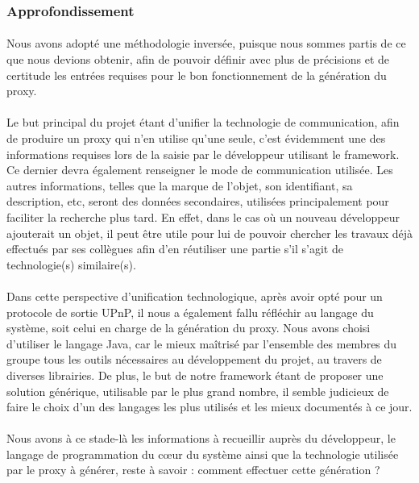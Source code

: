\documentclass[nocopyrightspace]{sigplanconf}
\begin{document}
		\subsubsection{Approfondissement}
			\paragraph{}
			Nous avons adopté une méthodologie inversée, puisque nous sommes partis de ce que nous devions obtenir, afin de pouvoir définir avec plus de précisions et de certitude les entrées requises pour le bon fonctionnement de la génération du proxy.

			\paragraph{}
			Le but principal du projet étant d’unifier la technologie de communication, afin de produire un proxy qui n’en utilise qu’une seule, c’est évidemment une des informations requises lors de la saisie par le développeur utilisant le framework. Ce dernier devra également renseigner le mode de communication utilisée. Les autres informations, telles que la marque de l’objet, son identifiant, sa description, etc, seront des données secondaires, utilisées principalement pour faciliter la recherche plus tard. En effet, dans le cas où un nouveau développeur ajouterait un objet, il peut être utile pour lui de pouvoir chercher les travaux déjà effectués par ses collègues afin d’en réutiliser une partie s’il s’agit de technologie(s) similaire(s).

			\paragraph{}
			Dans cette perspective d’unification technologique, après avoir opté pour un protocole de sortie UPnP, il nous a également fallu réfléchir au langage du système, soit celui en charge de la génération du proxy. Nous avons choisi d’utiliser le langage Java, car le mieux maîtrisé par l’ensemble des membres du groupe tous les outils nécessaires au développement du projet, au travers de diverses librairies. De plus, le but de notre framework étant de proposer une solution générique, utilisable par le plus grand nombre, il semble judicieux de faire le choix d’un des langages les plus utilisés et les mieux documentés à ce jour.

			\paragraph{}
			Nous avons à ce stade-là les informations à recueillir auprès du développeur, le langage de programmation du cœur du système ainsi que la technologie utilisée par le proxy à générer, reste à savoir : comment effectuer cette génération ?
\end{document}
